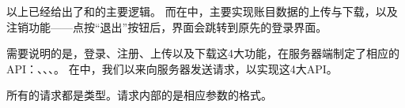 \documentclass{article}
\begin{document}
以上已经给出了和的主要逻辑。
而在中，主要实现账目数据的上传与下载，以及注销功能——点按“退出”按钮后，界面会跳转到原先的登录界面。

需要说明的是，登录、注册、上传以及下载这4大功能，在服务器端制定了相应的API：、、、。
在中，我们以来向服务器发送请求，以实现这4大API。%

所有的请求都是类型。请求内部的是相应参数的格式。%
\end{document}
